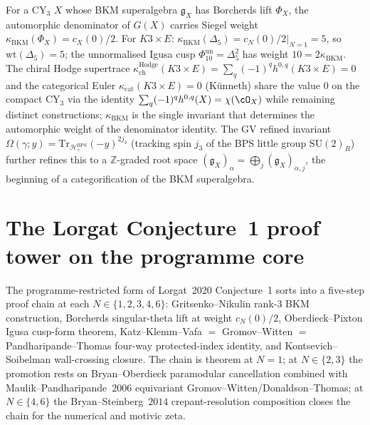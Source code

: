 \begin{remark}
\label{rem:phys-weight-kappa-ch}
For a CY$_3$ $X$ whose BKM superalgebra $\mathfrak g_X$ has Borcherds lift $\Phi_X$, the automorphic denominator of $G(X)$ carries Siegel weight $\kappa_{\mathrm{BKM}}(\Phi_X) = c_X(0)/2$. For $K3 \times E$: $\kappa_{\mathrm{BKM}}(\Delta_5) = \left.c_N(0)/2\right|_{N=1} = 5$, so $\mathrm{wt}(\Delta_5) = 5$; the unnormalised Igusa cusp \(\Phi_{10}^{\mathrm{un}}=\Delta_5^2\) has weight \(10 = 2\kappa_{\mathrm{BKM}}\). The chiral Hodge supertrace $\kappa_{\mathrm{ch}}^{\mathrm{Hodge}}(K3 \times E) = \sum_q (-1)^q h^{0, q}(K3 \times E) = 0$ and the categorical Euler $\kappa_{\mathrm{cat}}(K3 \times E) = 0$ (K\"unneth) share the value $0$ on the compact CY$_3$ via the identity $\sum_q (-1)^q h^{0, q}(X) = \chi(\cO_X)$ while remaining distinct constructions; $\kappa_{\mathrm{BKM}}$ is the single invariant that determines the automorphic weight of the denominator identity. The GV refined invariant $\Omega(\gamma; y) = \mathrm{Tr}_{\mathcal{H}_\gamma^{\mathrm{BPS}}} (-y)^{2j_3}$ (tracking spin $j_3$ of the BPS little group $\mathrm{SU}(2)_R$) further refines this to a $\mathbb{Z}$-graded root space $(\mathfrak{g}_X)_\alpha = \bigoplus_j (\mathfrak{g}_X)_{\alpha,j}$, the beginning of a categorification of the BKM superalgebra.
\end{remark}

\section{The Lorgat Conjecture~1 proof tower on the programme core}
\label{sec:k3e-lorgat-conj1-proof-tower}

The programme-restricted form of Lorgat~2020 Conjecture~1 sorts into a five-step proof chain at each $N \in \{1, 2, 3, 4, 6\}$: Gritsenko--Nikulin rank-$3$ BKM construction, Borcherds singular-theta lift at weight $c_N(0)/2$, Oberdieck--Pixton Igusa cusp-form theorem, Katz--Klemm--Vafa $=$ Gromov--Witten $=$ Pandharipande--Thomas four-way protected-index identity, and Kontsevich--Soibelman wall-crossing closure. The chain is theorem at $N = 1$; at $N \in \{2, 3\}$ the promotion rests on Bryan--Oberdieck paramodular cancellation combined with Maulik--Pandharipande~$2006$ equivariant Gromov--Witten/Donaldson--Thomas; at $N \in \{4, 6\}$ the Bryan--Steinberg~$2014$ crepant-resolution composition closes the chain for the numerical and motivic zeta.

